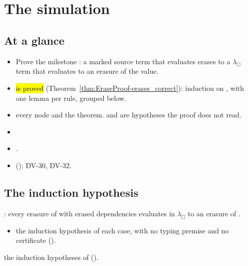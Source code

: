 \chapter{The simulation}\label{chap:simulation}

\section*{At a glance}
\begin{itemize}
\item {} Prove the milestone : a marked source term that evaluates erases to a $\lambda_\Box$ term that evaluates to an erasure of the value.
\item {} \hl{ is proved} (Theorem~\ref{thm:EraseProof-erases_correct}): induction on , with one lemma per rule, grouped below.
\item {} \stProved{} every node and the theorem.  and  are hypotheses the proof does not read.
\item {} 
\item {} .
\item {}  (); DV-30, DV-32.
\end{itemize}

\section{The induction hypothesis}\label{sec:simulation-ih}

\begin{definition}
  \label{def:EraseProof-ErasesSim}
  \leanok
   \hl{}: every erasure of  with erased dependencies evaluates in $\lambda_\Box$ to an erasure of .
  \begin{itemize}
  \item the induction hypothesis of each case, with no typing premise and no certificate ().
  \end{itemize}
   the induction hypotheses of  ().
\end{definition}

